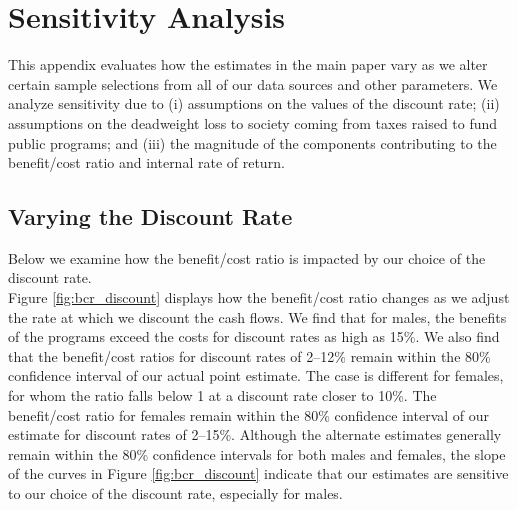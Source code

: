\section{Sensitivity Analysis} \label{appendix:sensitivity}

\noindent This appendix evaluates how the estimates in the main paper vary as we alter certain
sample selections from all of our data sources and other parameters. We analyze sensitivity due to (i) assumptions on the values of the discount rate; (ii) assumptions on the deadweight loss to society coming from taxes raised to fund public programs; and (iii) the magnitude of the components contributing to the benefit/cost ratio and internal rate of return. \\


\subsection{Varying the Discount Rate}


\noindent Below we examine how the benefit/cost ratio is impacted by our choice of the discount rate. \\

\noindent Figure \ref{fig:bcr_discount} displays how the benefit/cost ratio changes as we adjust
the rate at which we discount the cash flows. We find that for males, the benefits of 
the programs exceed the costs for discount rates as high as 15\%. We also
find that the benefit/cost ratios for discount rates of 2--12\% remain within the 
80\% confidence interval of our actual point estimate. The case is different for females,
for whom the ratio falls below 1 at a discount rate closer to 10\%. The benefit/cost ratio for 
females remain within the 80\% confidence interval of our estimate for discount rates
of 2--15\%. Although the alternate estimates generally remain within the 80\%
confidence intervals for both males and females, the slope of the curves in Figure
\ref{fig:bcr_discount} indicate that our estimates are sensitive to our choice of
the discount rate, especially for males. 

